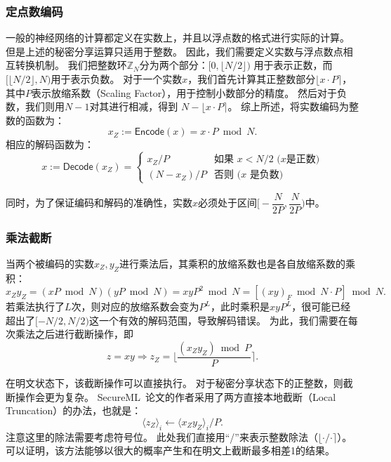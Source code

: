 \subsubsection{定点数编码}
一般的神经网络的计算都定义在实数上，并且以浮点数的格式进行实际的计算。
%
但是上述的秘密分享运算只适用于整数。
%
因此，我们需要定义实数与浮点数点相互转换机制。
%
我们把整数环$\mathbb Z_N$分为两个部分：$[0, \lfloor N/2 \rfloor)$ 用于表示正数，而$[\lfloor N/2 \rfloor, N)$用于表示负数。
%
对于一个实数$x$，我们首先计算其正整数部分$\lfloor x\cdot P \rceil$，其中$P$表示放缩系数（Scaling Factor），用于控制小数部分的精度。
%
然后对于负数，我们则用$N - 1$对其进行相减，得到 $N - \lfloor x\cdot P \rceil$。
%
综上所述，将实数编码为整数的函数为：
\begin{equation}
    x_Z := \mathsf{Encode}(x) = x \cdot P \bmod N.
\end{equation}
%
相应的解码函数为：
\begin{equation}
    x := \mathsf{Decode}(x_Z) = \begin{cases}
        x_Z / P         & \text{如果 $x < N/2$ ($x$是正数)} \\
        (N - x_Z) / P     & \text{否则 ($x$ 是负数)}
    \end{cases}
\end{equation}
%

同时，为了保证编码和解码的准确性，实数$x$必须处于区间$\big[ -\dfrac{N}{2P}, \dfrac{N}{2P} \big)$中。


\subsubsection{乘法截断}
当两个被编码的实数$x_Z, y_Z$进行乘法后，其乘积的放缩系数也是各自放缩系数的乘积：
\begin{equation}
    x_Zy_Z = (xP \bmod N)(yP \bmod N) = xyP^2 \bmod N = [(xy)_F \bmod N \cdot P] \bmod N.
\end{equation}
%
若乘法执行了$L$次，则对应的放缩系数会变为$P^L$，此时乘积是$xyP^L$，很可能已经超出了$[-N/2, N/2)$这一个有效的解码范围，导致解码错误。
%
为此，我们需要在每次乘法之后进行截断操作，即
\begin{equation}
    z = xy \Rightarrow z_Z = \Big\lfloor \dfrac{(x_Z y_Z) \bmod P}{P} \Big\rceil.
\end{equation}
%

在明文状态下，该截断操作可以直接执行。
%
对于秘密分享状态下的正整数，则截断操作会更为复杂。
%
SecureML~\cite{mohassel2017secureml}论文的作者采用了两方直接本地截断（Local Truncation）的办法，也就是：
\begin{equation}
    \langle z_Z \rangle_i \gets \langle x_Zy_Z \rangle_i / P.
\end{equation}
%
注意这里的除法需要考虑符号位。
此处我们直接用“/”来表示整数除法（$\lfloor \cdot / \cdot \rceil$）。
%
可以证明，该方法能够以很大的概率产生和在明文上截断最多相差1的结果。

